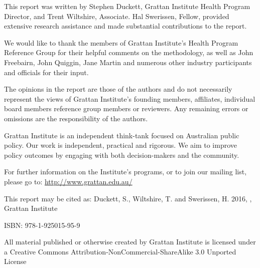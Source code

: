 This report was written by Stephen Duckett, Grattan Institute Health Program Director, and Trent Wiltshire, Associate. Hal Swerissen, Fellow, provided extensive research assistance and made substantial contributions to the report.

We would like to thank the members of Grattan Institute's Health Program Reference Group for their helpful comments on the methodology, as well as John Freebairn, John Quiggin, Jane Martin and numerous other industry participants and officials for their input.

The opinions in the report are those of the authors and do not necessarily represent the views of Grattan Institute’s founding members, affiliates, individual board members reference group members or reviewers. Any remaining errors or omissions are the responsibility of the authors.

Grattan Institute is an independent think-tank focused on Australian public policy. Our work is independent, practical and rigorous. We aim to improve policy outcomes by engaging with both decision-makers and the community.

For further information on the Institute's programs, or to join our mailing list, please go to:
\textcolor{blue}{\url{http://www.grattan.edu.au/}}

{\footnotesize
This report may be cited as:
\newline
Duckett, S., Wiltshire, T. and Swerissen, H. 2016, \emph{\mytitle}, Grattan Institute

ISBN: 978-1-925015-95-9

All material published or otherwise created by Grattan Institute is licensed under a Creative Commons Attribution-NonCommercial-ShareAlike 3.0 Unported License\par 
}